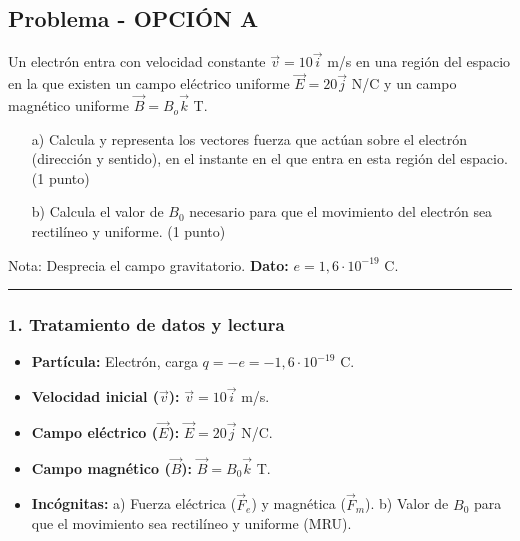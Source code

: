 \subsection{Problema - OPCIÓN A}
\label{subsec:4A_2011_sep_ext}

\begin{cajaenunciado}
Un electrón entra con velocidad constante $\vec{v}=10\vec{i}$ m/s en una región del espacio en la que existen un campo eléctrico uniforme $\vec{E}=20\vec{j}$ N/C y un campo magnético uniforme $\vec{B}=B_{o}\vec{k}$ T.
\begin{enumerate}
    \item[a)] Calcula y representa los vectores fuerza que actúan sobre el electrón (dirección y sentido), en el instante en el que entra en esta región del espacio. (1 punto)
    \item[b)] Calcula el valor de $B_{0}$ necesario para que el movimiento del electrón sea rectilíneo y uniforme. (1 punto)
\end{enumerate}
Nota: Desprecia el campo gravitatorio. \textbf{Dato:} $e = 1,6\cdot10^{-19}$ C.
\end{cajaenunciado}
\hrule

\subsubsection*{1. Tratamiento de datos y lectura}
\begin{itemize}
    \item \textbf{Partícula:} Electrón, carga $q = -e = -1,6 \cdot 10^{-19}$ C.
    \item \textbf{Velocidad inicial ($\vec{v}$):} $\vec{v} = 10 \vec{i}$ m/s.
    \item \textbf{Campo eléctrico ($\vec{E}$):} $\vec{E} = 20 \vec{j}$ N/C.
    \item \textbf{Campo magnético ($\vec{B}$):} $\vec{B} = B_0 \vec{k}$ T.
    \item \textbf{Incógnitas:} a) Fuerza eléctrica ($\vec{F}_e$) y magnética ($\vec{F}_m$). b) Valor de $B_0$ para que el movimiento sea rectilíneo y uniforme (MRU).
\end{itemize}

